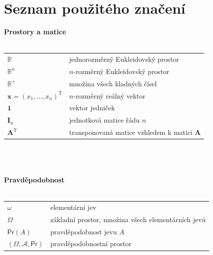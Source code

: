 \documentclass[a4paper,12pt]{report}
\theoremstyle{definition} \newtheorem{definice}[veta]{Definice}
\theoremstyle{remark}
\begin{document}
\tableofcontents {}

\chapter*{Seznam použitého značení} 

\normalsize
\textbf{Prostory a matice}\\\\
   \begin{tabular}{p{4cm} p{9.3cm}}
   $\mathbb{R}$                              &   jednorozměrný Eukleidovský prostor \\
   $\mathbb{R}^n$                              &     $n$-rozměrný Eukleidovský prostor \\
   $\mathbb{R}^+$                              &     množina všech kladných čísel \\
   $\boldsymbol{x}=(x_1,\ldots,x_n)^\mathrm{T}$             &    $n$-rozměrný reálný vektor \\
    $\boldsymbol{1}$                           &   vektor jedniček\\
   $\mathbf{I}_n$                              &    jednotková matice řádu $n$ \\
   $\mathbf{A}^\mathrm{T}$                              &   transponovaná matice vzhledem k matici $\mathbf{A}$\\
   \end{tabular}\\\\\\
%
%
\textbf{Pravděpodobnost}\\\\
   \begin{tabular}{p{4cm} p{9.3cm}}
   $\omega$				        & elementární jev\\
   $\Omega$                                          &   základní prostor, množina všech elementárních jevů \\
   $\mathsf{Pr}(A)$                               &  pravděpodobnost jevu $A$ \\
   $(\Omega,\mathcal{A}, \mathsf{Pr})$                         &   pravděpodobnostní prostor \\
   \end{tabular}\\\\\\
\end{document}
